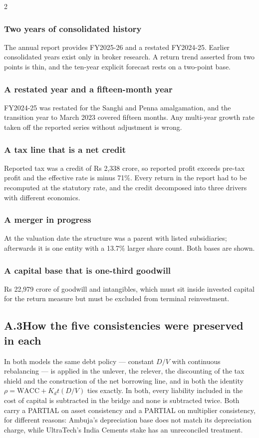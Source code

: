 \begin{paracol}{2}
\subsubsection{Two years of consolidated history} The annual report provides
FY2025-26 and a restated FY2024-25. Earlier consolidated years exist only in broker
research. A return trend asserted from two points is thin, and the ten-year explicit
forecast rests on a two-point base.

\subsubsection{A restated year and a fifteen-month year} FY2024-25 was restated for
the Sanghi and Penna amalgamation, and the transition year to March 2023 covered
fifteen months. Any multi-year growth rate taken off the reported series without
adjustment is wrong.

\subsubsection{A tax line that is a net credit} Reported tax was a credit of
Rs 2,338 crore, so reported profit exceeds pre-tax profit and the effective rate is
minus 71\%. Every return in the report had to be recomputed at the statutory rate,
and the credit decomposed into three drivers with different economics.

\subsubsection{A merger in progress} At the valuation date the structure was a parent
with listed subsidiaries; afterwards it is one entity with a 13.7\% larger share
count. Both bases are shown.

\subsubsection{A capital base that is one-third goodwill} Rs 22,979 crore of goodwill
and intangibles, which must sit inside invested capital for the return measure but
must be excluded from terminal reinvestment.

\subsection*{A.3\quad How the five consistencies were preserved in each}

In both models the same debt policy — constant $D/V$ with continuous rebalancing — is
applied in the unlever, the relever, the discounting of the tax shield and the
construction of the net borrowing line, and in both the identity $\rho = \text{WACC}
+ K_d t (D/V)$ ties exactly. In both, every liability included in the cost of capital
is subtracted in the bridge and none is subtracted twice. Both carry a PARTIAL on
asset consistency and a PARTIAL on multiplier consistency, for different reasons:
Ambuja's depreciation base does not match its depreciation charge, while UltraTech's
India Cements stake has an unreconciled treatment.


\end{paracol}
